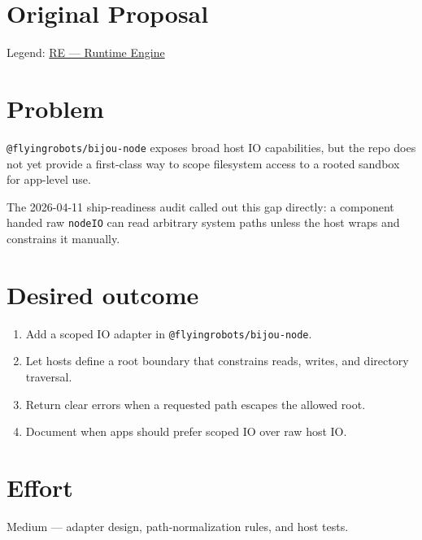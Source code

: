 \section{Original Proposal}\label{record-383-original-proposal}

Legend: \href{https://github.com/flyingrobots/bijou/blob/1853ad902f6bf219326409e7f743a5a1d6517dbc/docs/method/legends/RE-runtime-engine.md}{RE --- Runtime Engine}

\section{Problem}\label{record-383-problem}

\texttt{@\allowbreak{}f\allowbreak{}l\allowbreak{}y\allowbreak{}i\allowbreak{}n\allowbreak{}g\allowbreak{}r\allowbreak{}o\allowbreak{}b\allowbreak{}o\allowbreak{}t\allowbreak{}s\allowbreak{}/\allowbreak{}b\allowbreak{}i\allowbreak{}j\allowbreak{}o\allowbreak{}u\allowbreak{}-\allowbreak{}n\allowbreak{}o\allowbreak{}d\allowbreak{}e} exposes broad host IO capabilities, but the repo does not yet provide a first-class way to scope filesystem access to a rooted sandbox for app-level use.

The 2026-04-11 ship-readiness audit called out this gap directly: a component handed raw \texttt{n\allowbreak{}o\allowbreak{}d\allowbreak{}e\allowbreak{}I\allowbreak{}O} can read arbitrary system paths unless the host wraps and constrains it manually.

\section{Desired outcome}\label{record-383-desired-outcome}

\begin{enumerate}
\def\labelenumi{\arabic{enumi}.}
\tightlist
\item
  Add a scoped IO adapter in \texttt{@\allowbreak{}f\allowbreak{}l\allowbreak{}y\allowbreak{}i\allowbreak{}n\allowbreak{}g\allowbreak{}r\allowbreak{}o\allowbreak{}b\allowbreak{}o\allowbreak{}t\allowbreak{}s\allowbreak{}/\allowbreak{}b\allowbreak{}i\allowbreak{}j\allowbreak{}o\allowbreak{}u\allowbreak{}-\allowbreak{}n\allowbreak{}o\allowbreak{}d\allowbreak{}e}.
\item
  Let hosts define a root boundary that constrains reads, writes, and directory traversal.
\item
  Return clear errors when a requested path escapes the allowed root.
\item
  Document when apps should prefer scoped IO over raw host IO.
\end{enumerate}

\section{Effort}\label{record-383-effort}

Medium --- adapter design, path-normalization rules, and host tests.

